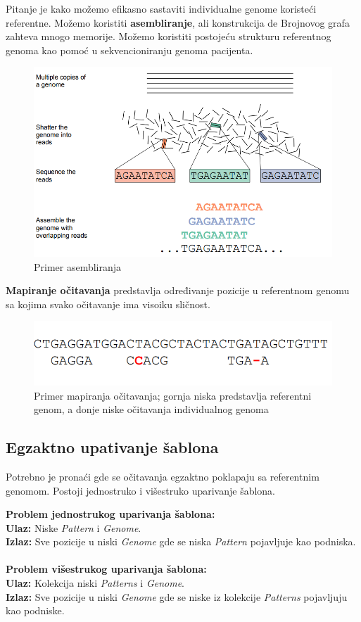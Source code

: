 Pitanje je kako možemo efikasno sastaviti individualne genome koristeći referentne. Možemo koristiti \textbf{asembliranje}, ali konstrukcija de Brojnovog grafa zahteva mnogo memorije. Možemo koristiti postojeću strukturu referentnog genoma kao pomoć u sekvencioniranju genoma pacijenta.
\begin{figure}[h!]
\centering
\includegraphics[scale=0.5]{poglavlja/9/slike/asembliranje.png}
\caption{Primer asembliranja}
\label{slika:X}
\end{figure}
\newpage
\textbf{Mapiranje očitavanja} predstavlja određivanje pozicije u referentnom genomu sa kojima svako očitavanje ima visoiku sličnost.

\begin{figure}[h!]
\centering
\includegraphics[scale=0.5]{poglavlja/9/slike/mapiranjeOcitavanja.png}
\caption{Primer mapiranja očitavanja; gornja niska predstavlja referentni genom, a donje niske očitavanja individualnog genoma}
\label{slika:X}
\end{figure}

\subsection{Egzaktno upativanje šablona}
Potrebno je pronaći gde se očitavanja egzaktno poklapaju sa referentnim genomom. Postoji jednostruko i višestruko uparivanje šablona.

\textbf{Problem jednostrukog uparivanja šablona:} \\
\indent \textbf{Ulaz:} Niske \textit{Pattern} i \textit{Genome}. \\
\indent \textbf{Izlaz:} Sve pozicije u niski \textit{Genome} gde se niska \textit{Pattern} pojavljuje kao podniska.
\\\\
\textbf{Problem višestrukog uparivanja šablona:} \\
\indent \textbf{Ulaz:} Kolekcija niski \textit{Patterns} i \textit{Genome}. \\
\indent \textbf{Izlaz:} Sve pozicije u niski \textit{Genome} gde se niske iz kolekcije \textit{Patterns} pojavljuju kao podniske.


